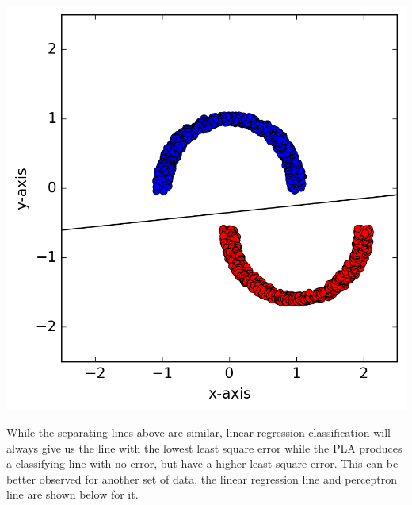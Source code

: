 \documentclass[a4paper]{article}
\begin{document}
\begin {description}
\begin{doublespace}
\begin{enumerate}[(a)]
\begin{center}
\includegraphics[scale=0.65]{Problem_3_1b.png}
\end{center}

While the separating lines above are similar, linear regression classification will always give us the line with the lowest least square error while the PLA produces a classifying line with no error, but have a higher least square error. This can be better observed for another set of data, the linear regression line and perceptron line are shown below for it.


\end{enumerate}
\end{doublespace}
\end{description}
\end{document}
